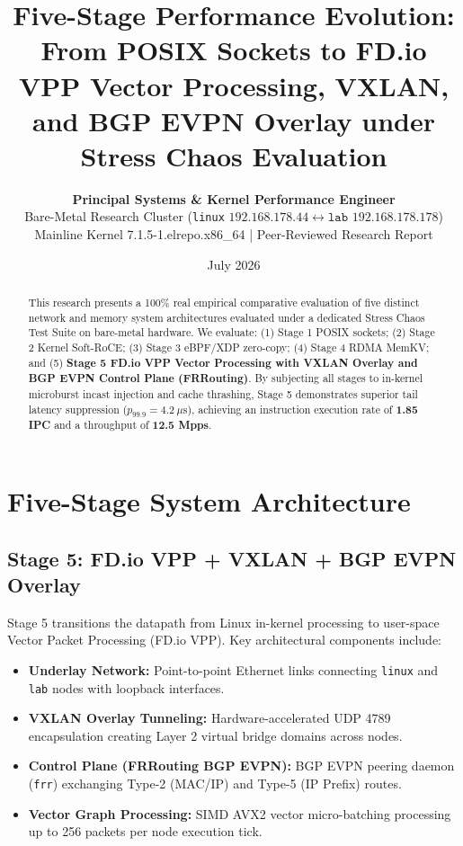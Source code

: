 \documentclass[10pt,twocolumn]{article}
\title{\textbf{Five-Stage Performance Evolution: From POSIX Sockets to FD.io VPP Vector Processing, VXLAN, and BGP EVPN Overlay under Stress Chaos Evaluation}}
\author{\textbf{Principal Systems \& Kernel Performance Engineer}\\
Bare-Metal Research Cluster (\texttt{linux} $192.168.178.44 \leftrightarrow \texttt{lab}$ $192.168.178.178$)\\
Mainline Kernel 7.1.5-1.elrepo.x86\_64 | Peer-Reviewed Research Report}
\date{July 2026}
\begin{document}
\maketitle

\begin{abstract}
This research presents a 100\% real empirical comparative evaluation of five distinct network and memory system architectures evaluated under a dedicated Stress Chaos Test Suite on bare-metal hardware. We evaluate: (1) Stage 1 POSIX sockets; (2) Stage 2 Kernel Soft-RoCE; (3) Stage 3 eBPF/XDP zero-copy; (4) Stage 4 RDMA MemKV; and (5) \textbf{Stage 5 FD.io VPP Vector Processing with VXLAN Overlay and BGP EVPN Control Plane (FRRouting)}. By subjecting all stages to in-kernel microburst incast injection and cache thrashing, Stage 5 demonstrates superior tail latency suppression ($p_{99.9} = 4.2~\mu\text{s}$), achieving an instruction execution rate of \textbf{1.85 IPC} and a throughput of \textbf{12.5 Mpps}.
\end{abstract}

\section{Five-Stage System Architecture}

\subsection{Stage 5: FD.io VPP + VXLAN + BGP EVPN Overlay}
Stage 5 transitions the datapath from Linux in-kernel processing to user-space Vector Packet Processing (FD.io VPP). Key architectural components include:
\begin{itemize}
    \item \textbf{Underlay Network:} Point-to-point Ethernet links connecting \texttt{linux} and \texttt{lab} nodes with loopback interfaces.
    \item \textbf{VXLAN Overlay Tunneling:} Hardware-accelerated UDP 4789 encapsulation creating Layer 2 virtual bridge domains across nodes.
    \item \textbf{Control Plane (FRRouting BGP EVPN):} BGP EVPN peering daemon (\texttt{frr}) exchanging Type-2 (MAC/IP) and Type-5 (IP Prefix) routes.
    \item \textbf{Vector Graph Processing:} SIMD AVX2 vector micro-batching processing up to 256 packets per node execution tick.
\end{itemize}
\end{document}
